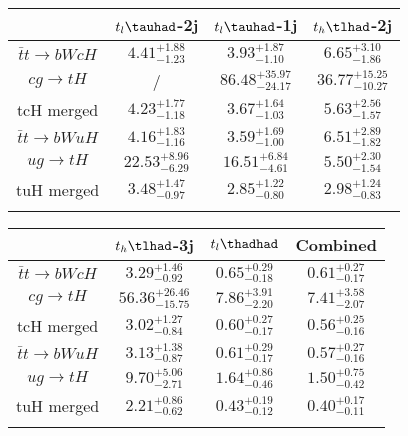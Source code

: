 \centering
\begin{tabular}{|cccc} \toprule\toprule
 & $t_l\tauhad$-2j & $t_l\tauhad$-1j & $t_h\tlhad$-2j\\\midrule
$\bar{t}t\to bWcH$ & $4.41^{+1.88}_{-1.23}$ & $3.93^{+1.87}_{-1.10}$ & $6.65^{+3.10}_{-1.86}$\\
$cg\to tH$ &  / & $86.48^{+35.97}_{-24.17}$ & $36.77^{+15.25}_{-10.27}$\\
tcH merged & $4.23^{+1.77}_{-1.18}$ & $3.67^{+1.64}_{-1.03}$ & $5.63^{+2.56}_{-1.57}$\\
$\bar{t}t\to bWuH$ & $4.16^{+1.83}_{-1.16}$ & $3.59^{+1.69}_{-1.00}$ & $6.51^{+2.89}_{-1.82}$\\
$ug\to tH$ & $22.53^{+8.96}_{-6.29}$ & $16.51^{+6.84}_{-4.61}$ & $5.50^{+2.30}_{-1.54}$\\
tuH merged & $3.48^{+1.47}_{-0.97}$ & $2.85^{+1.22}_{-0.80}$ & $2.98^{+1.24}_{-0.83}$\\
\bottomrule\bottomrule\\
\end{tabular}
\begin{tabular}{|cccc} \toprule\toprule
 & $t_h\tlhad$-3j & $t_l\thadhad$ & Combined\\\midrule
$\bar{t}t\to bWcH$ & $3.29^{+1.46}_{-0.92}$ & $0.65^{+0.29}_{-0.18}$ & $0.61^{+0.27}_{-0.17}$\\
$cg\to tH$ & $56.36^{+26.46}_{-15.75}$ & $7.86^{+3.91}_{-2.20}$ & $7.41^{+3.58}_{-2.07}$\\
tcH merged & $3.02^{+1.27}_{-0.84}$ & $0.60^{+0.27}_{-0.17}$ & $0.56^{+0.25}_{-0.16}$\\
$\bar{t}t\to bWuH$ & $3.13^{+1.38}_{-0.87}$ & $0.61^{+0.29}_{-0.17}$ & $0.57^{+0.27}_{-0.16}$\\
$ug\to tH$ & $9.70^{+5.06}_{-2.71}$ & $1.64^{+0.86}_{-0.46}$ & $1.50^{+0.75}_{-0.42}$\\
tuH merged & $2.21^{+0.86}_{-0.62}$ & $0.43^{+0.19}_{-0.12}$ & $0.40^{+0.17}_{-0.11}$\\
\bottomrule\bottomrule\\
\end{tabular}
